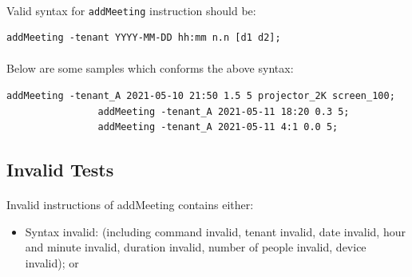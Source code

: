 \documentclass{article}
\begin{document}
            \paragraph{}
            Valid syntax for \texttt{addMeeting} instruction should be:
            \begin{Verbatim}[gobble=8]
                addMeeting -tenant YYYY-MM-DD hh:mm n.n [d1 d2]; 
            \end{Verbatim}
            \paragraph{}
            Below are some samples which conforms the above syntax:
            \begin{Verbatim}[gobble=8]
                addMeeting -tenant_A 2021-05-10 21:50 1.5 5 projector_2K screen_100;
                addMeeting -tenant_A 2021-05-11 18:20 0.3 5;
                addMeeting -tenant_A 2021-05-11 4:1 0.0 5;
            \end{Verbatim}
        
        
        \subsection{Invalid Tests}
            \paragraph{}
            Invalid instructions of addMeeting contains either:
            
            \begin{itemize}
            \item Syntax invalid: (including command invalid, tenant invalid, date invalid, hour and minute invalid,
            duration invalid, number of people invalid, device invalid); or
            \end{itemize}
            
\end{document}
